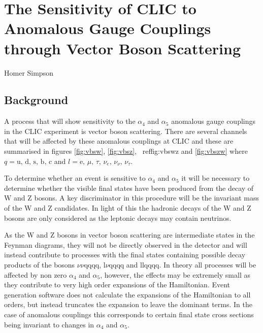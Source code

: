 \chapter{The Sensitivity of CLIC to Anomalous Gauge Couplings through Vector Boson Scattering}
\label{chap:PhysicsAnalysis}


%
{Homer Simpson}

\section{Background}
A process that will show sensitivity to the $\alpha_{4}$ and $\alpha_{5}$ anomalous gauge couplings in the CLIC experiment is vector boson scattering. There are several channels that will be affected by these anomalous couplings at CLIC and these are summarised in figures \ref{fig:vbsw}, \ref{fig:vbsz}, \ ref{fig:vbswz} and \ref{fig:vbszw} where $q = \text{u, d, s, b, c}$ and $l = \text{e, } \mu \text{, } \tau \text{, } \nu_{e} \text{, } \nu_{\nu} \text{, } \nu_{\tau}$.

To determine whether an event is sensitive to $\alpha_{4}$ and $\alpha_{5}$ it will be necessary to determine whether the visible final states have been produced from the decay of W and Z bosons. A key discriminator in this procedure will be the invariant mass of the W and Z candidates. In light of this the hadronic decays of the W and Z bosons are only considered as the leptonic decays may contain neutrinos.

As the W and Z bosons in vector boson scattering are intermediate states in the Feynman diagrams, they will not be directly observed in the detector and will instead contribute to processes with the final states containing possible decay products of the bosons $\nu\nu\text{qqqq}$, $\text{l}\nu\text{qqqq}$ and llqqqq. In theory all processes will be affected by non zero $\alpha_{4}$ and $\alpha_{5}$, however, the effects may be extremely small as they contribute to very high order expansions of the Hamiltonian. Event generation software does not calculate the expansions of the Hamiltonian to all orders, but instead truncates the expansion to leave the dominant terms. In the case of anomalous couplings this corresponds to certain final state cross sections being invariant to changes in $\alpha_{4}$ and $\alpha_{5}$.

